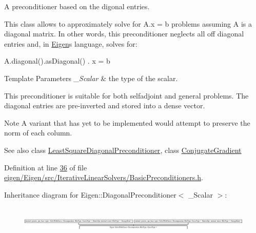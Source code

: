 A preconditioner based on the digonal entries. 

This class allows to approximately solve for A.\+x = b problems assuming A is a diagonal matrix. In other words, this preconditioner neglects all off diagonal entries and, in \hyperlink{namespace_eigen}{Eigen}\textquotesingle{}s language, solves for\+: 
\begin{DoxyCode}
A.diagonal().asDiagonal() . x = b
\end{DoxyCode}



\begin{DoxyTemplParams}{Template Parameters}
{\em \+\_\+\+Scalar} & the type of the scalar.\\
\hline
\end{DoxyTemplParams}


This preconditioner is suitable for both selfadjoint and general problems. The diagonal entries are pre-\/inverted and stored into a dense vector.

\begin{DoxyNote}{Note}
A variant that has yet to be implemented would attempt to preserve the norm of each column.
\end{DoxyNote}
\begin{DoxySeeAlso}{See also}
class \hyperlink{group___iterative_linear_solvers___module_class_eigen_1_1_least_square_diagonal_preconditioner}{Least\+Square\+Diagonal\+Preconditioner}, class \hyperlink{group___iterative_linear_solvers___module_class_eigen_1_1_conjugate_gradient}{Conjugate\+Gradient} 
\end{DoxySeeAlso}


Definition at line \hyperlink{eigen_2_eigen_2src_2_iterative_linear_solvers_2_basic_preconditioners_8h_source_l00036}{36} of file \hyperlink{eigen_2_eigen_2src_2_iterative_linear_solvers_2_basic_preconditioners_8h_source}{eigen/\+Eigen/src/\+Iterative\+Linear\+Solvers/\+Basic\+Preconditioners.\+h}.

Inheritance diagram for Eigen\+:\+:Diagonal\+Preconditioner$<$ \+\_\+\+Scalar $>$\+:\begin{figure}[H]
\begin{center}
\leavevmode
\includegraphics[height=1.702128cm]{group___iterative_linear_solvers___module}
\end{center}
\end{figure}
